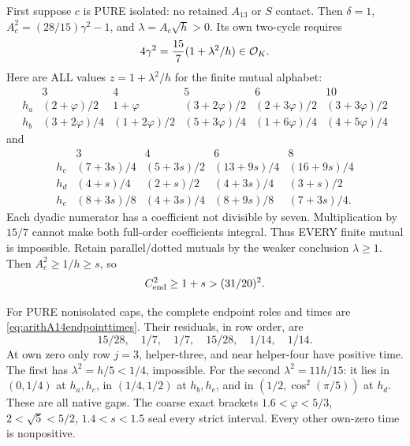 First suppose \(c\) is PURE isolated:
no retained \(A_{13}\) or \(S\) contact.
Then \(\delta=1\),
\(A_c^2=(28/15)\gamma^2-1\),
and \(\lambda=A_c\sqrt h>0\).
Its own two-cycle requires
\[
                    4\gamma^2={15\over7}(1+\lambda^2/h)
                                     \in\mathcal O_K .
\]
Here are ALL values \(z=1+\lambda^2/h\)
for the finite mutual alphabet:
\[
 \begin{array}{c|ccccc}
 &3&4&5&6&10\\ \hline
 h_a&(2+\varphi)/2&1+\varphi&(3+2\varphi)/2&
                    (2+3\varphi)/2&(3+3\varphi)/2\\
 h_b&(3+2\varphi)/4&(1+2\varphi)/2&(5+3\varphi)/4&
                    (1+6\varphi)/4&(4+5\varphi)/4
 \end{array}
\]
and
\[
 \begin{array}{c|cccc}
 &3&4&6&8\\ \hline
 h_c&(7+3s)/4&(5+3s)/2&(13+9s)/4&(16+9s)/4\\
 h_d&(4+s)/4&(2+s)/2&(4+3s)/4&(3+s)/2\\
 h_e&(8+3s)/8&(4+3s)/4&(8+9s)/8&(7+3s)/4 .
 \end{array}
\]
Each dyadic numerator has a coefficient
not divisible by seven.
Multiplication by \(15/7\) cannot make
both full-order coefficients integral.
Thus EVERY finite mutual is impossible.
Retain parallel/dotted mutuals by the
weaker conclusion \(\lambda\ge1\).
Then \(A_c^2\ge1/h\ge s\), so
\[
                  C_{\rm end}^2\ge1+s>(31/20)^2 .
\]

For PURE nonisolated caps, the complete
endpoint roles and times are
\eqref{eq:arithA14endpointtimes}.
Their residuals, in row order, are
\[
                         15/28,\quad1/7,\quad1/7,\quad15/28,
                                      \quad1/14,\quad1/14 .
\]
At own zero only row \(j=3\), helper-three,
and near helper-four have positive time.
The first has \(\lambda^2=h/5<1/4\),
impossible.
For the second \(\lambda^2=11h/15\):
it lies in \((0,1/4)\) at \(h_a,h_c\),
in \((1/4,1/2)\) at \(h_b,h_e\),
and in \((1/2,\cos^2(\pi/5))\) at \(h_d\).
These are all native gaps.
The coarse exact brackets
\(1.6<\varphi<5/3\),
\(2<\sqrt5<5/2\), \(1.4<s<1.5\)
seal every strict interval.
Every other own-zero time is nonpositive.

